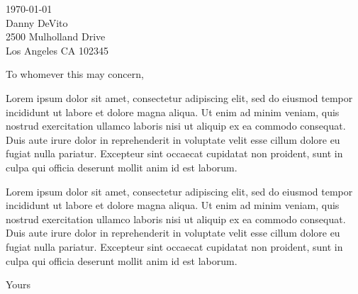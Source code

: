 \documentclass[myletter, a4paper, 11pt]{scrlttr2}
\begin{document}
\begin{letter}{\today \\Danny DeVito \\2500 Mulholland Drive \\Los Angeles CA 102345}

\opening{To whomever this may concern,}

Lorem ipsum dolor sit amet, consectetur adipiscing elit, sed do eiusmod tempor incididunt ut labore et dolore magna aliqua. Ut enim ad minim veniam, quis nostrud exercitation ullamco laboris nisi ut aliquip ex ea commodo consequat. Duis aute irure dolor in reprehenderit in voluptate velit esse cillum dolore eu fugiat nulla pariatur. Excepteur sint occaecat cupidatat non proident, sunt in culpa qui officia deserunt mollit anim id est laborum.

Lorem ipsum dolor sit amet, consectetur adipiscing elit, sed do eiusmod tempor incididunt ut labore et dolore magna aliqua. Ut enim ad minim veniam, quis nostrud exercitation ullamco laboris nisi ut aliquip ex ea commodo consequat. Duis aute irure dolor in reprehenderit in voluptate velit esse cillum dolore eu fugiat nulla pariatur. Excepteur sint occaecat cupidatat non proident, sunt in culpa qui officia deserunt mollit anim id est laborum.

\closing{Yours}


\end{letter}
\end{document}
